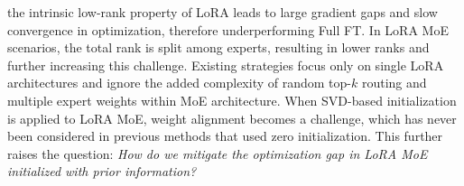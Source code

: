 the intrinsic low-rank property of LoRA leads to large gradient gaps and slow convergence in optimization, therefore underperforming Full FT.
In LoRA MoE scenarios, the total rank is split among experts, resulting in lower ranks and further increasing this challenge.
Existing strategies \cite{wanglora, wang2024loraprolowrankadaptersproperly} focus only on single LoRA architectures and ignore the added complexity of random top-$k$ routing and multiple expert weights within MoE architecture. 
When SVD-based initialization is applied to LoRA MoE, weight alignment becomes a challenge, which has never been considered in previous methods that used zero initialization.
This further raises the question: 
\textit{How do we mitigate the optimization gap in LoRA MoE initialized with prior information?}

